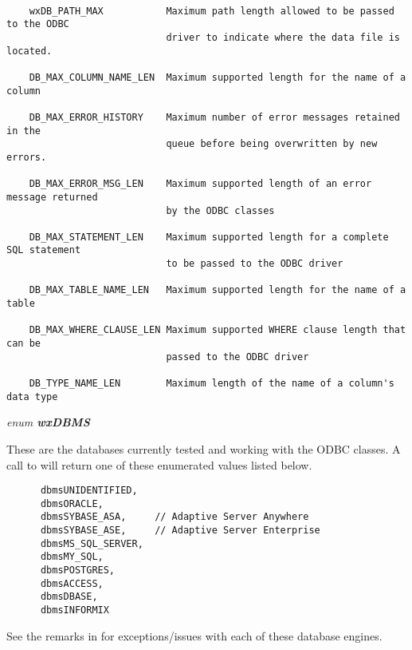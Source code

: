 \begin{verbatim}

    wxDB_PATH_MAX           Maximum path length allowed to be passed to the ODBC
                            driver to indicate where the data file is located.

    DB_MAX_COLUMN_NAME_LEN  Maximum supported length for the name of a column

    DB_MAX_ERROR_HISTORY    Maximum number of error messages retained in the
                            queue before being overwritten by new errors.

    DB_MAX_ERROR_MSG_LEN    Maximum supported length of an error message returned 
                            by the ODBC classes

    DB_MAX_STATEMENT_LEN    Maximum supported length for a complete SQL statement
                            to be passed to the ODBC driver

    DB_MAX_TABLE_NAME_LEN   Maximum supported length for the name of a table

    DB_MAX_WHERE_CLAUSE_LEN Maximum supported WHERE clause length that can be 
                            passed to the ODBC driver

    DB_TYPE_NAME_LEN        Maximum length of the name of a column's data type
\end{verbatim}




{\it enum {\bf wxDBMS}}

These are the databases currently tested and working with the ODBC classes.  A call to  will return one of these enumerated values listed below.

\begin{verbatim}
      dbmsUNIDENTIFIED,
      dbmsORACLE,
      dbmsSYBASE_ASA,     // Adaptive Server Anywhere
      dbmsSYBASE_ASE,     // Adaptive Server Enterprise
      dbmsMS_SQL_SERVER,
      dbmsMY_SQL,
      dbmsPOSTGRES,
      dbmsACCESS,
      dbmsDBASE,
      dbmsINFORMIX
\end{verbatim}

See the remarks in  for exceptions/issues with each of these database engines.



